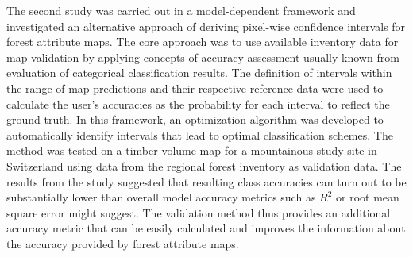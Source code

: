 The second study was carried out in a model-dependent framework and investigated an alternative approach of deriving pixel-wise confidence intervals for forest attribute maps. The core approach was to use available inventory data for map validation by applying concepts of accuracy assessment usually known from evaluation of categorical classification results. The definition of intervals within the range of map predictions and their respective reference data were used to calculate the user's accuracies as the probability for each interval to reflect the ground truth. In this framework, an optimization algorithm was developed to automatically identify intervals that lead to optimal classification schemes. The method was tested on a timber volume map for a mountainous study site in Switzerland using data from the regional forest inventory as validation data. The results from the study suggested that resulting class accuracies can turn out to be substantially lower than overall model accuracy metrics such as $R^2$ or root mean square error might suggest. The validation method thus provides an additional accuracy metric that can be easily calculated and improves the information about the accuracy provided by forest attribute maps.

